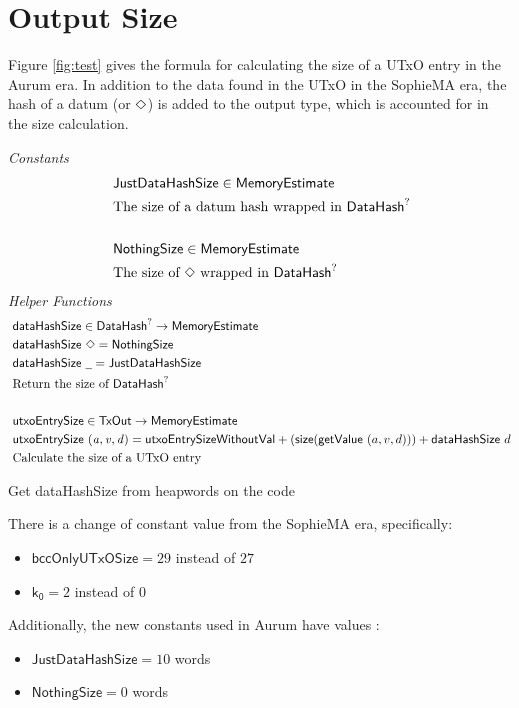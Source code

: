 \section{Output Size}
\label{sec:value-size}

Figure \ref{fig:test} gives the formula for calculating the size of a UTxO entry
in the Aurum era. In addition to the data found in the UTxO in the SophieMA
era, the hash of a datum (or $\Diamond$) is added to the output type, which
is accounted for in the size calculation.

\begin{figure*}[h]
  \emph{Constants}
  \begin{align*}
  & \mathsf{JustDataHashSize} \in \mathsf{MemoryEstimate} \\
  & \text{The size of a datum hash wrapped in $\mathsf{DataHash}^?$} \\~
  \\
  & \mathsf{NothingSize} \in \mathsf{MemoryEstimate} \\
  & \text{The size of $\Diamond$ wrapped in $\mathsf{DataHash}^?$}
  \end{align*}
  \emph{Helper Functions}
  \begin{align*}
    & \fun{dataHashSize} \in \DataHash^? \to \MemoryEstimate \\
    & \fun{dataHashSize}~ \Nothing = \mathsf{NothingSize} \\
    & \fun{dataHashSize}~ \wcard = \mathsf{JustDataHashSize} \\
    & \text{Return the size of $\DataHash^?$} \\~\\
    & \fun{utxoEntrySize} \in \TxOut \to \MemoryEstimate \\
    & \fun{utxoEntrySize}~\var{(a, v, d)} = \mathsf{utxoEntrySizeWithoutVal} + (\fun{size} (\fun{getValue}~(a, v, d))) + \mathsf{dataHashSize}~d \\
    & \text{Calculate the size of a UTxO entry}
  \end{align*}
  \caption{Value Size}
  \label{fig:test}
\end{figure*}

\begin{note}
  Get dataHashSize from heapwords on the code
\end{note}

There is a change of constant value from the SophieMA era, specifically:

\begin{itemize}
  \item $\mathsf{bccOnlyUTxOSize} = 29$ instead of $27$
  \item $\mathsf{k_0} = 2$ instead of $0$
\end{itemize}

Additionally, the new constants used in Aurum have values :

\begin{itemize}
  \item $\mathsf{JustDataHashSize} = 10$ words
  \item $\mathsf{NothingSize} = 0$ words
\end{itemize}

